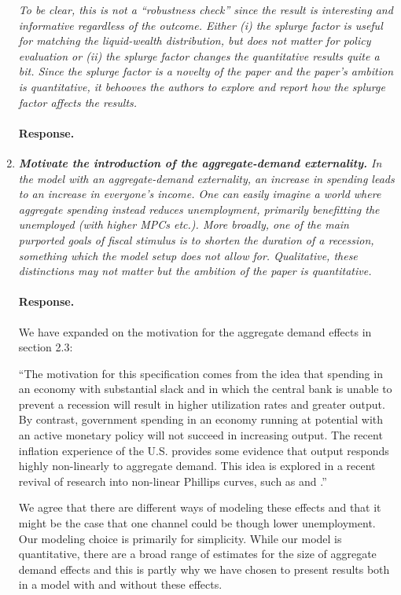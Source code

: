 \documentclass[12pt,letterpaper,english]{article}
\begin{document}
\begin{enumerate}
	\textit{To be clear, this is not a “robustness check” since the result is interesting and informative regardless of the outcome. Either (i) the splurge factor is useful for matching the liquid-wealth distribution, but does not matter for policy evaluation or (ii) the splurge factor changes the	quantitative results quite a bit. Since the splurge factor is a novelty	of the paper and the paper’s ambition is quantitative, it behooves the authors to explore and report how the splurge factor affects the results. }
	
	\paragraph{Response.} 

	\item \textit{\textbf{Motivate the introduction of the aggregate-demand externality.}  In the model with an aggregate-demand externality, an increase in spending leads to an increase in everyone’s income. One can easily imagine a world where aggregate spending instead reduces unemployment, primarily benefitting the unemployed (with higher MPCs etc.). More broadly, one of the main purported goals of fiscal stimulus is to shorten the duration of a recession, something which the model setup does not allow for. Qualitative, these distinctions may not matter but the ambition	of the paper is quantitative.}
	
	\paragraph{Response.} We have expanded on the motivation for the aggregate demand effects in section 2.3:
	
	``The motivation for this specification comes from the idea that spending in an economy with substantial slack and in which the central bank is unable to prevent a recession will result in higher utilization rates and greater output. By contrast, government spending in an economy running at potential with an active monetary policy will not succeed in increasing output. The recent inflation experience of the U.S. provides some evidence that output responds highly non-linearly to aggregate demand. This idea is explored in a recent revival of research into non-linear Phillips curves, such as \cite{benigno2023baaack} and \cite{blanco2024nonlinear}.''
	
	We agree that there are different ways of modeling these effects and that it might be the case that one channel could be though lower unemployment. Our modeling choice is primarily for simplicity. While our model is quantitative, there are a broad range of estimates for the size of aggregate demand effects and this is partly why we have chosen to present results both in a model with and without these effects. 
	

\end{enumerate}
\end{document}
